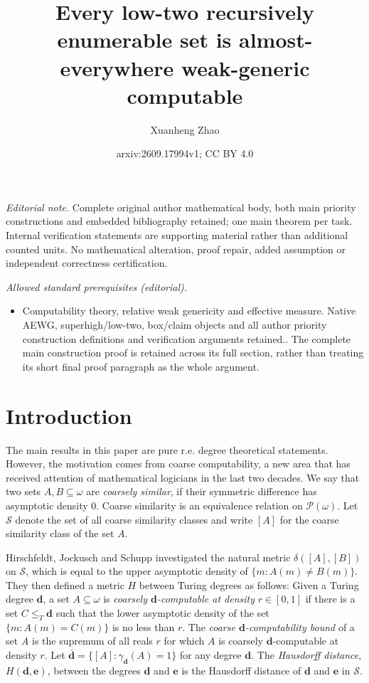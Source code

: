 \documentclass[10pt,a4paper]{amsart}
\title{Every low-two recursively enumerable set is almost-everywhere weak-generic computable}
\author{Xuanheng Zhao}
\date{arxiv:2609.17994v1; CC BY 4.0}
\begin{document}
\maketitle
\noindent\textit{Editorial note.} Complete original author mathematical body, both main priority constructions and embedded bibliography retained; one main theorem per task. Internal verification statements are supporting material rather than additional counted units. No mathematical alteration, proof repair, added assumption or independent correctness certification.\par\medskip
\noindent\textit{Allowed standard prerequisites (editorial).}\begin{itemize}
\item Computability theory, relative weak genericity and effective measure. Native AEWG, superhigh/low-two, box/claim objects and all author priority construction definitions and verification arguments retained.. The complete main construction proof is retained across its full section, rather than treating its short final proof paragraph as the whole argument.
\end{itemize}\medskip
\section{Introduction}

The main results in this paper are pure r.e. degree theoretical statements.
However, the motivation comes from coarse computability, a new area that has
received attention of mathematical logicians in the last two decades.
We say that two sets $A, B \subseteq \omega$ are {\emph{coarsely similar}}, if their symmetric difference has asymptotic density 0. Coarse similarity is an equivalence relation on $\mathcal{P} (\omega)$.
Let $\mathcal{S}$ denote the set of all coarse similarity classes and write
$[A]$ for the coarse similarity class of the set $A$. 

Hirschfeldt, Jockusch
and Schupp {\cite{MR4741732}} investigated the natural metric $\delta ([A], [B])$ on $\mathcal{S}$, which is equal to the upper asymptotic density of $\{ m: A (m)
   \neq B (m) \}$. They then defined a metric $H$
between Turing degrees as follows:
Given a Turing degree $\mathbf{d}$, a set $A \subseteq \omega$ is
{\emph{coarsely $\mathbf{d}$-computable at density}} $r \in [0, 1]$ if there
is a set $C \leq_T \mathbf{d}$ such that the lower asymptotic density of the set $\{m:A(m)=C(m)\}$ is no less than $r$.
The {\emph{coarse $\mathbf{d}$-computability bound}} of a set $A$ is
 the supremum of all reals $r$ for which $A$ is coarsely $\mathbf{d}$-computable at density $r$.
Let $\bar{\mathbf{d}} = \{ [A] : \gamma_{\mathbf{d}} (A) = 1 \}$ for any
degree $\mathbf{d}$. The {\emph{Hausdorff distance}}, $H (\mathbf{d}, \mathbf{e})$,
between the degrees $\mathbf{d}$ and $\mathbf{e}$ is the Hausdorff distance of $\mathbf{d}$ and $\mathbf{e}$ in $\mathcal{S}$.
\end{document}
